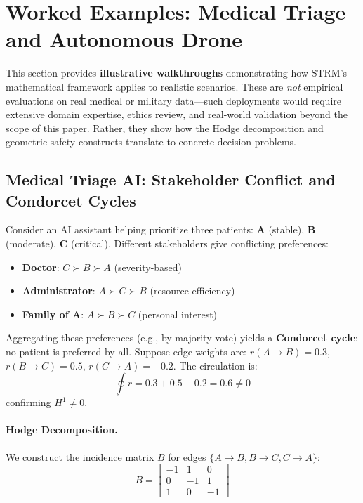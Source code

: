 \section{Worked Examples: Medical Triage and Autonomous Drone}
\label{app:worked_examples}

This section provides \textbf{illustrative walkthroughs} demonstrating how STRM's mathematical framework applies to realistic scenarios. These are \emph{not} empirical evaluations on real medical or military data---such deployments would require extensive domain expertise, ethics review, and real-world validation beyond the scope of this paper. Rather, they show how the Hodge decomposition and geometric safety constructs translate to concrete decision problems.

\subsection{Medical Triage AI: Stakeholder Conflict and Condorcet Cycles}

Consider an AI assistant helping prioritize three patients: \textbf{A} (stable), \textbf{B} (moderate), \textbf{C} (critical). Different stakeholders give conflicting preferences:
\begin{itemize}
    \item \textbf{Doctor}: $C \succ B \succ A$ (severity-based)
    \item \textbf{Administrator}: $A \succ C \succ B$ (resource efficiency)
    \item \textbf{Family of A}: $A \succ B \succ C$ (personal interest)
\end{itemize}

Aggregating these preferences (e.g., by majority vote) yields a \textbf{Condorcet cycle}: no patient is preferred by all. Suppose edge weights are: $r(A \to B) = 0.3$, $r(B \to C) = 0.5$, $r(C \to A) = -0.2$. The circulation is:
\[
\textstyle \oint r = 0.3 + 0.5 - 0.2 = 0.6 \neq 0
\]
confirming $H^1 \neq 0$.

\paragraph{Hodge Decomposition.}
We construct the incidence matrix $B$ for edges $\{A \to B, B \to C, C \to A\}$:
\begin{equation}
B = \begin{bmatrix}
-1 & 1 & 0 \\
0 & -1 & 1 \\
1 & 0 & -1
\end{bmatrix}
\end{equation}

